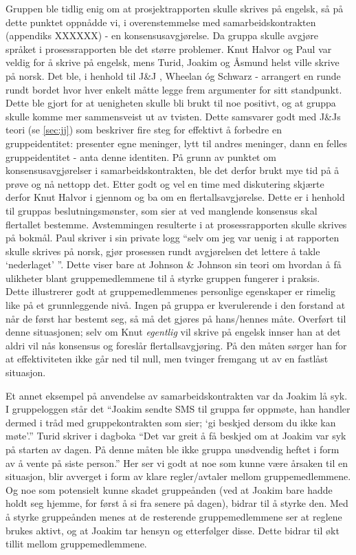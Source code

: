 Gruppen ble tidlig enig om at prosjektrapporten skulle skrives på engelsk, så på
dette punktet oppnådde vi, i overenstemmelse med samarbeidskontrakten (appendiks
XXXXXX) - en konsensusavgjørelse. Da gruppa skulle avgjøre språket i
prosessrapporten ble det større problemer. Knut Halvor og Paul var veldig for å
skrive på engelsk, mens Turid, Joakim og Åsmund helst ville skrive på norsk. Det
ble, i henhold til J\&J \cite{jj}, Wheelan \cite{wheelan} óg Schwarz
\cite{schwarz} - arrangert en runde rundt bordet hvor hver enkelt måtte legge
frem argumenter for sitt standpunkt. Dette ble gjort for at uenigheten skulle
bli brukt til noe positivt, og at gruppa skulle komme mer sammensveist ut av
tvisten. Dette samsvarer godt med J\&Js teori (se \cref{sec:jj}) som beskriver
fire steg for effektivt å forbedre en gruppeidentitet: presenter egne meninger,
lytt til andres meninger, dann en felles gruppeidentitet - anta denne identiten.
På grunn av punktet om konsensusavgjørelser i samarbeidskontrakten, ble det
derfor brukt mye tid på å prøve og nå nettopp det. Etter godt og vel en time med
diskutering skjærte derfor Knut Halvor i gjennom og ba om en
flertallsavgjørelse. Dette er i henhold til gruppas beslutningsmønster, som sier
at ved manglende konsensus skal flertallet bestemme. Avstemmingen resulterte i
at prosessrapporten skulle skrives på bokmål. Paul skriver i sin private logg ``selv om jeg var uenig i at rapporten skulle
skrives på norsk, gjør prosessen rundt avgjørelsen det lettere å takle
`nederlaget' ''. Dette viser bare at Johnson \& Johnson sin teori \cite{jj} om
hvordan å få ulikheter blant gruppemedlemmene til å styrke gruppen fungerer i
praksis. \\

Dette illustrerer godt at gruppemedlemmenes personlige egenskaper er rimelig
like på et grunnleggende nivå. Ingen på gruppa er kverulerende i den forstand at
når de først har bestemt seg, så må det gjøres på hans/hennes måte. Overført til
denne situasjonen; selv om Knut \emph{egentlig} vil skrive på
engelsk innser han at det aldri vil nås konsensus og foreslår
flertallsavgjøring. På den måten sørger han for at effektiviteten ikke går ned
til null, men tvinger fremgang ut av en fastlåst situasjon. 

Et annet eksempel på anvendelse av samarbeidskontrakten var da Joakim lå syk. I
gruppeloggen står det ``Joakim sendte SMS til gruppa før oppmøte, han handler
dermed i tråd med gruppekontrakten som sier; `gi beskjed dersom du ikke kan
møte'.'' Turid skriver i dagboka ``Det var greit å få beskjed om at Joakim var
syk på starten av dagen. På denne måten ble ikke gruppa unødvendig heftet i form
av å vente på siste person.'' Her ser vi godt at noe som kunne være årsaken til
en situasjon, blir avverget i form av klare regler/avtaler mellom
gruppemedlemmene. Og noe som potensielt kunne skadet gruppeånden (ved at Joakim
bare hadde holdt seg hjemme, for først å si fra senere på dagen), bidrar til å
styrke den. Med å styrke gruppeånden menes at de resterende gruppemedlemmene ser
at reglene brukes aktivt, og at Joakim tar hensyn og etterfølger disse. Dette
bidrar til økt tillit mellom gruppemedlemmene.


